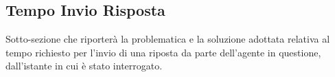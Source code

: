\subsection{Tempo Invio Risposta}

Sotto-sezione che riporterà la problematica e la soluzione adottata relativa al tempo richiesto per l'invio di una riposta da parte dell'agente in questione, dall'istante in cui è stato interrogato.
